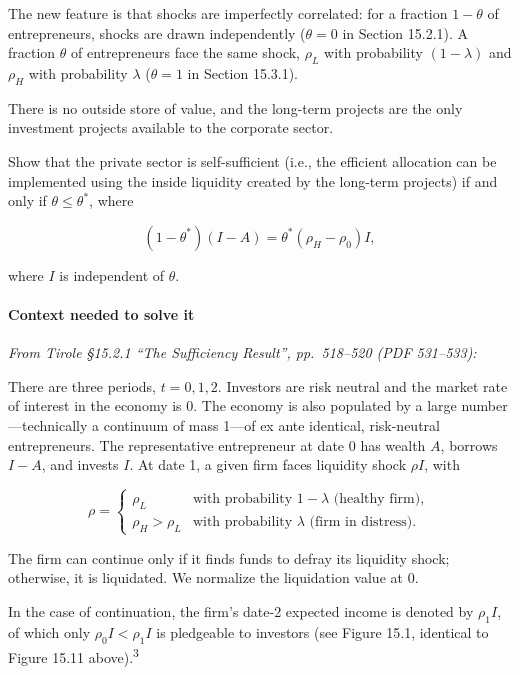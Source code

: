 \documentclass[11pt,a4paper]{article}
\begin{document}
The new feature is that shocks are imperfectly correlated: for a fraction \(1 - \theta\) of
entrepreneurs, shocks are drawn independently (\(\theta = 0\) in Section 15.2.1). A fraction
\(\theta\) of entrepreneurs face the same shock, \(\rho_L\) with probability \((1 - \lambda)\) and
\(\rho_H\) with probability \(\lambda\) (\(\theta = 1\) in Section 15.3.1).

There is no outside store of value, and the long-term projects are the only investment projects
available to the corporate sector.

Show that the private sector is self-sufficient (i.e., the efficient allocation can be implemented
using the inside liquidity created by the long-term projects) if and only if
\(\theta \leqslant \theta^*\), where

\[(1 - \theta^*)(I - A) = \theta^*(\rho_H - \rho_0)I,\]

where \(I\) is independent of \(\theta\).

\paragraph{Context needed to solve it}

\emph{From Tirole §15.2.1 ``The Sufficiency Result'', pp.~518--520 (PDF 531--533):}

There are three periods, \(t = 0, 1, 2\). Investors are risk neutral and the market rate of interest
in the economy is 0. The economy is also populated by a large number---technically a continuum of
mass 1---of ex ante identical, risk-neutral entrepreneurs. The representative entrepreneur at date 0
has wealth \(A\), borrows \(I - A\), and invests \(I\). At date 1, a given firm faces liquidity
shock \(\rho I\), with

\[\rho = \begin{cases} \rho_L & \text{with probability } 1 - \lambda \text{ (healthy firm)},\\ \rho_H > \rho_L & \text{with probability } \lambda \text{ (firm in distress)}.\end{cases}\]

The firm can continue only if it finds funds to defray its liquidity shock; otherwise, it is
liquidated. We normalize the liquidation value at 0.

In the case of continuation, the firm's date-2 expected income is denoted by \(\rho_1 I\), of which
only \(\rho_0 I < \rho_1 I\) is pledgeable to investors (see Figure 15.1, identical to Figure 15.11
above).\textsuperscript{3}
\end{document}
